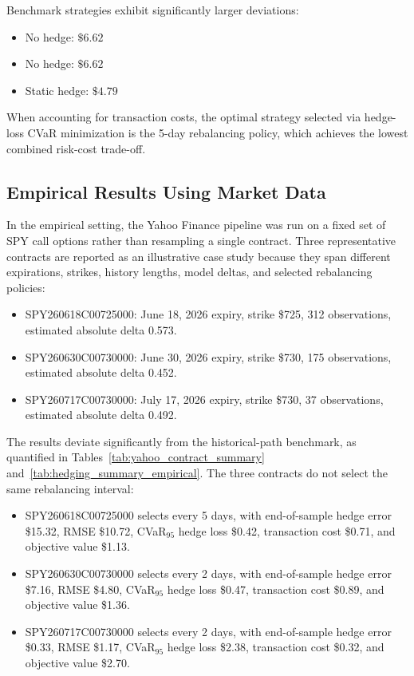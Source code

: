 \documentclass{article}
\begin{document}
Benchmark strategies exhibit significantly larger deviations:
\begin{itemize}
    \item No hedge: $\$6.62$
    \item No hedge: $\$6.62$
    \item Static hedge: $\$4.79$
\end{itemize}

When accounting for transaction costs, the optimal strategy selected via hedge-loss CVaR minimization is the 5-day rebalancing policy, which achieves the lowest combined risk-cost trade-off.

\subsection{Empirical Results Using Market Data}

In the empirical setting, the Yahoo Finance pipeline was run on a fixed set of SPY call options rather than resampling a single contract. Three representative contracts are reported as an illustrative case study because they span different expirations, strikes, history lengths, model deltas, and selected rebalancing policies:
\begin{itemize}
    \item SPY260618C00725000: June 18, 2026 expiry, strike \$725, 312 observations, estimated absolute delta 0.573.
    \item SPY260630C00730000: June 30, 2026 expiry, strike \$730, 175 observations, estimated absolute delta 0.452.
    \item SPY260717C00730000: July 17, 2026 expiry, strike \$730, 37 observations, estimated absolute delta 0.492.
\end{itemize}

The results deviate significantly from the historical-path benchmark, as quantified in Tables~\ref{tab:yahoo_contract_summary} and~\ref{tab:hedging_summary_empirical}. The three contracts do not select the same rebalancing interval:
\begin{itemize}
    \item SPY260618C00725000 selects every 5 days, with end-of-sample hedge error \$15.32, RMSE \$10.72, CVaR$_{95}$ hedge loss \$0.42, transaction cost \$0.71, and objective value \$1.13.
    \item SPY260630C00730000 selects every 2 days, with end-of-sample hedge error \$7.16, RMSE \$4.80, CVaR$_{95}$ hedge loss \$0.47, transaction cost \$0.89, and objective value \$1.36.
    \item SPY260717C00730000 selects every 2 days, with end-of-sample hedge error \$0.33, RMSE \$1.17, CVaR$_{95}$ hedge loss \$2.38, transaction cost \$0.32, and objective value \$2.70.
\end{itemize}
\end{document}
